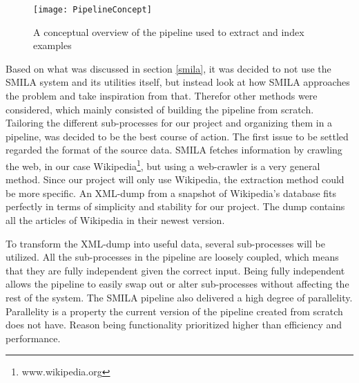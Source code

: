 \begin{figure}[h]
\caption{A conceptual overview of the pipeline used to extract and index examples}
\texttt{[image: PipelineConcept]}
\end{figure}



Based on what was discussed in section \ref{smila}, it was decided to not use the SMILA system and its utilities itself, but instead look at how SMILA approaches the problem and take inspiration from that. Therefor other methods were considered, which mainly consisted of building the pipeline from scratch. Tailoring the different sub-processes for our project and organizing them in a pipeline, was decided to be the best course of action. The first issue to be settled regarded the format of the source data. SMILA fetches information by crawling the web, in our case Wikipedia\footnote{www.wikipedia.org}, but using a web-crawler is a very general method. Since our project will only use Wikipedia, the extraction method could be more specific. An XML-dump from a snapshot of Wikipedia's database fits perfectly in terms of simplicity and stability for our project. The dump contains all the articles of Wikipedia in their newest version.

To transform the XML-dump into useful data, several sub-processes will be utilized. All the sub-processes in the pipeline are loosely coupled, which means that they are fully independent given the correct input. Being fully independent allows the pipeline to easily swap out or alter sub-processes without affecting the rest of the system. The SMILA pipeline also delivered a high degree of parallelity. Parallelity is a property the current version of the pipeline created from scratch does not have. Reason being functionality prioritized higher than efficiency and performance. 

